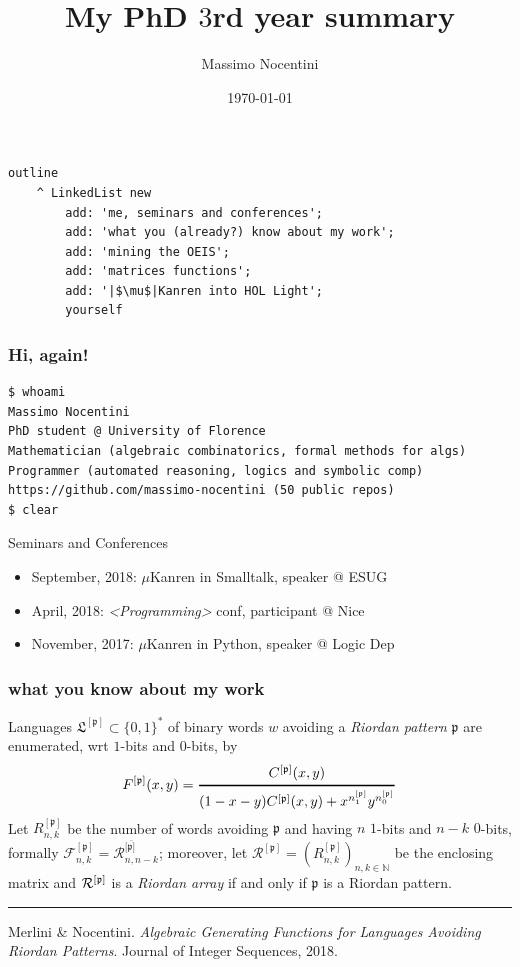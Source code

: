 \documentclass[9pt]{beamer}
\title{My PhD $3$rd year summary}
\author{Massimo Nocentini}
\institute{University of Florence, Italy}
\date{\today}
\begin{document}
\frame{\titlepage}


\begin{frame}[fragile]
\frametitle{}
\begin{verbatim}
outline
    ^ LinkedList new
        add: 'me, seminars and conferences';
        add: 'what you (already?) know about my work';
        add: 'mining the OEIS';
        add: 'matrices functions';
        add: '|$\mu$|Kanren into HOL Light'; 
        yourself
\end{verbatim}
\end{frame}


\begin{frame}[fragile]
\frametitle{Hi, again!}
\begin{Verbatim}
$ whoami
Massimo Nocentini
PhD student @ University of Florence
Mathematician (algebraic combinatorics, formal methods for algs)
Programmer (automated reasoning, logics and symbolic comp)
https://github.com/massimo-nocentini (50 public repos)
$ clear
\end{Verbatim}

\begin{block}{Seminars and Conferences}
\begin{itemize}
\item September, 2018: $\mu$Kanren in Smalltalk, speaker @ ESUG
\item April, 2018: \textit{<Programming>} conf, participant @ Nice
\item November, 2017: $\mu$Kanren in Python, speaker @ Logic Dep 
\end{itemize}
\end{block}

\end{frame}


\begin{frame}[fragile]
\frametitle{what you know about my work}

Languages $\mathfrak{L}^{[\mathfrak{p}]}\subset \{0,1\}^*$ of binary words $w$
avoiding a \textit{Riordan pattern} $\mathfrak{p}$ are enumerated,
wrt $1$-bits and $0$-bits, by
$$F^{[\mathfrak{p}]}(x,y)
=\genfrac{}{}{1pt}{0}{C^{[\mathfrak{p}]}(x,y)}{(1-x-y)C^{[\mathfrak{p}]}(x,y)
+x^{n_1^{[\mathfrak{p}]}}y^{n_0^{[\mathfrak{p}]}}}$$
Let $R_{n,k}^{[\mathfrak{p}]}$ be the number of words avoiding $\mathfrak{p}$
and having $n$ $1$-bits  and $n-k$  $0$-bits, formally 
${\mathcal{F}_{n,k}^{[\mathfrak{p}]}} = {\mathcal{R}_{n,
n-k}^{[\bar{\mathfrak{p}]}}}$; moreover, let
$\mathcal{R}^{[\mathfrak{p}]}=\left(R_{n,k}^{[\mathfrak{p}]}\right)_{n,k\in\mathbb{N}}$
be the enclosing matrix and ${\cal{R}^{[\mathfrak{p}]}}$ is a
\textit{Riordan array} if and only if  $\mathfrak{p}$ is a Riordan pattern.
\vfill
\noindent\rule{\textwidth}{0.1pt}
{\footnotesize
Merlini \& Nocentini. \textit{Algebraic Generating Functions for Languages
Avoiding Riordan Patterns}.  Journal of Integer Sequences, 2018.}
\end{frame}
\end{document}
